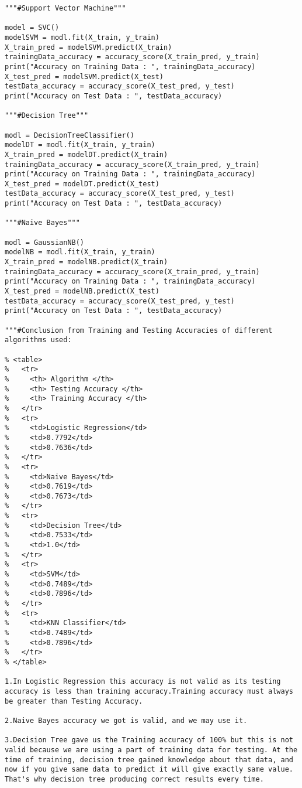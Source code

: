 \documentclass[pdftex,a4paper,11pt,oneside,openright]{report}
\begin{document}
\begin{lstlisting}
"""#Support Vector Machine"""

model = SVC()
modelSVM = modl.fit(X_train, y_train)
X_train_pred = modelSVM.predict(X_train)
trainingData_accuracy = accuracy_score(X_train_pred, y_train)
print("Accuracy on Training Data : ", trainingData_accuracy)
X_test_pred = modelSVM.predict(X_test)
testData_accuracy = accuracy_score(X_test_pred, y_test)
print("Accuracy on Test Data : ", testData_accuracy)

"""#Decision Tree"""

modl = DecisionTreeClassifier()
modelDT = modl.fit(X_train, y_train)
X_train_pred = modelDT.predict(X_train)
trainingData_accuracy = accuracy_score(X_train_pred, y_train)
print("Accuracy on Training Data : ", trainingData_accuracy)
X_test_pred = modelDT.predict(X_test)
testData_accuracy = accuracy_score(X_test_pred, y_test)
print("Accuracy on Test Data : ", testData_accuracy)

"""#Naive Bayes"""

modl = GaussianNB()
modelNB = modl.fit(X_train, y_train)
X_train_pred = modelNB.predict(X_train)
trainingData_accuracy = accuracy_score(X_train_pred, y_train)
print("Accuracy on Training Data : ", trainingData_accuracy)
X_test_pred = modelNB.predict(X_test)
testData_accuracy = accuracy_score(X_test_pred, y_test)
print("Accuracy on Test Data : ", testData_accuracy)

"""#Conclusion from Training and Testing Accuracies of different algorithms used:

% <table>
%   <tr>
%     <th> Algorithm </th>
%     <th> Testing Accuracy </th>
%     <th> Training Accuracy </th>
%   </tr>
%   <tr>
%     <td>Logistic Regression</td>
%     <td>0.7792</td>
%     <td>0.7636</td>
%   </tr>
%   <tr>
%     <td>Naive Bayes</td>
%     <td>0.7619</td>
%     <td>0.7673</td>
%   </tr>
%   <tr>
%     <td>Decision Tree</td>
%     <td>0.7533</td>
%     <td>1.0</td>
%   </tr>
%   <tr>
%     <td>SVM</td>
%     <td>0.7489</td>
%     <td>0.7896</td>
%   </tr>
%   <tr>
%     <td>KNN Classifier</td>
%     <td>0.7489</td>
%     <td>0.7896</td>
%   </tr>
% </table>

1.In Logistic Regression this accuracy is not valid as its testing accuracy is less than training accuracy.Training accuracy must always be greater than Testing Accuracy.

2.Naive Bayes accuracy we got is valid, and we may use it.

3.Decision Tree gave us the Training accuracy of 100% but this is not valid because we are using a part of training data for testing. At the time of training, decision tree gained knowledge about that data, and now if you give same data to predict it will give exactly same value. That's why decision tree producing correct results every time.


\end{lstlisting}
\end{document}
